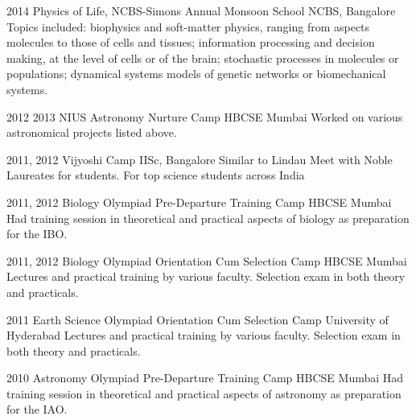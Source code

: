 \documentclass[11pt]{friggeri-cv}
\begin{document}
\begin{entrylist}
  \entryy
    {2014}
    {Physics of Life, NCBS-Simons Annual Monsoon School}
    {NCBS, Bangalore}
    {Topics included: biophysics and soft-matter physics, ranging from aspects molecules to those of cells and tissues; information processing and decision making, at the level of cells or of the brain; stochastic processes in molecules or populations; dynamical systems models of genetic networks or biomechanical systems.}
    
\end{entrylist}


\begin{entrylist}
  \entryy
    {2012 2013}
    {NIUS Astronomy Nurture Camp}
    {HBCSE Mumbai}
    {Worked on various astronomical projects listed above.}
\end{entrylist}


\begin{entrylist}
  \entryy
    {2011, 2012}
    {Vijyoshi Camp}
    {IISc, Bangalore}
    {Similar to Lindau Meet with Noble Laureates for students. For top  science students across India }
    
\end{entrylist}

\begin{entrylist}
  \entryy
    {2011, 2012}
    {Biology Olympiad Pre-Departure Training Camp}
    {HBCSE Mumbai}
    {Had training session in theoretical and practical aspects of biology as preparation for the IBO.}
\end{entrylist}

\begin{entrylist}
  \entryy
    {2011, 2012}
    {Biology Olympiad Orientation Cum Selection Camp}
    {HBCSE Mumbai}
    {Lectures and practical training by various faculty. Selection exam in both theory and practicals.}
\end{entrylist}


\begin{entrylist}
  \entryy
    {2011}
    {Earth Science Olympiad Orientation Cum Selection Camp}
    {University of Hyderabad}
    {Lectures and practical training by various faculty. Selection exam in both theory and practicals.}

\end{entrylist}

\begin{entrylist}
  \entryy
    {2010}
    {Astronomy Olympiad Pre-Departure Training Camp}
    {HBCSE Mumbai}
    {Had training session in theoretical and practical aspects of astronomy as preparation for the IAO.}
\end{entrylist}
\end{document}
